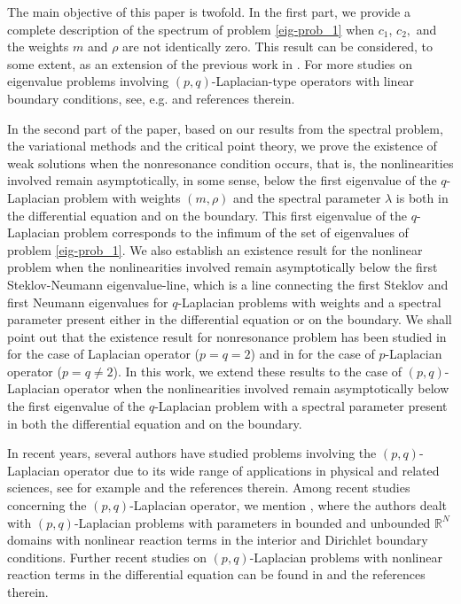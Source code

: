 \documentclass[pdflatex,sn-mathphys-num]{sn-jnl}
\theoremstyle{thmstyleone}%
\theoremstyle{thmstyletwo}%
\theoremstyle{thmstylethree}%
\theoremstyle{thmstylethree}%
\begin{document}
The main objective of this paper is twofold. In the first part, we provide a complete description of the spectrum of problem \eqref{eig-prob_1}  when $c_1$, $ c_2,$ and the weights $ m$ and $\rho$ are  not identically zero. This result can be considered, to some extent, as  an extension of the previous work in \cite {BLM,BLMG,mavinga,MNN,MM}. 
For more studies on eigenvalue problems involving $(p,q)$-Laplacian-type operators with linear boundary conditions, see, e.g. \cite{BLBAMG,BBMG, GJMORR,PNVCVF,PP} and references therein. 


In the second part of the paper, based on our results from the spectral problem, the variational methods and the critical point theory, we prove the existence of weak solutions when the nonresonance condition occurs, that is, the nonlinearities involved remain  asymptotically, in some sense, below the first eigenvalue of  the $q$-Laplacian problem with weights $(m,\rho)$ and the spectral parameter $\lambda$ is  both in the differential equation and on the boundary. This first eigenvalue of  the $q$-Laplacian problem corresponds to the infimum of the set of eigenvalues of problem \eqref{eig-prob_1}. We also establish an existence result for the nonlinear problem when the nonlinearities involved  remain asymptotically  below the first Steklov-Neumann eigenvalue-line, which is a line connecting the first Steklov  and first Neumann  eigenvalues for $q$-Laplacian problems  with weights and a spectral parameter present  either in the differential equation or on the boundary.
We shall point out that the existence result for nonresonance problem has been studied in \cite{MNN, mavinga} for the case of Laplacian operator ($p=q=2$) and in \cite{ dGMR} for the case of  $p$-Laplacian  operator ($p=q\neq 2$). In this work, we extend these results to the case of $(p,q)$-Laplacian operator when the nonlinearities involved remain asymptotically below the first eigenvalue of  the $q$-Laplacian problem with a spectral parameter present in both the differential equation and on the boundary.


In  recent years, several authors have studied problems involving the  $(p,q)$-Laplacian operator due to its wide range of applications in physical and related sciences, see for example \cite{BDAFP, CI, PW}  and the references therein. Among  recent  studies concerning the $(p,q)$-Laplacian operator, we mention   \cite{SP,MSPKW}, where the authors dealt with  $(p,q)$-Laplacian problems with parameters in  bounded and unbounded $\mathbb{R}^ N$  domains with  nonlinear reaction terms in the interior and Dirichlet boundary conditions. Further recent studies on $(p,q)$-Laplacian problems with nonlinear reaction terms in the differential equation can be found in \cite{AEMV,SATEW, WBH} and the references therein.
\end{document}
